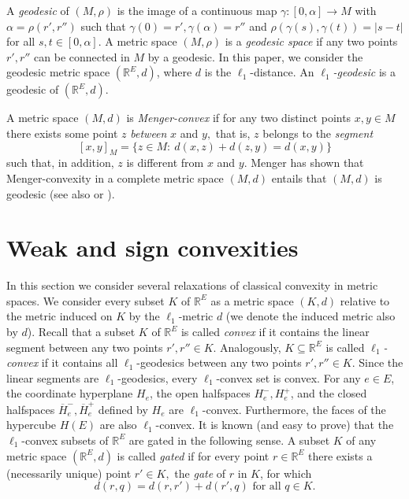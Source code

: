 \documentclass[11pt,a4paper]{amsart}
\theoremstyle{definition}
\numberwithin{equation}{section}
\newcommand{\HH}{\ensuremath{H}}
\newcommand{\MM}{\ensuremath{M}}
\begin{document}
A \emph{geodesic} of $(M,\rho)$ is the image of a continuous map $\gamma: [0,\alpha]\rightarrow M$ with $\alpha=\rho(r',r'')$ such that $\gamma(0)=r', \gamma(\alpha)=r''$ and $\rho(\gamma(s),\gamma(t))=|s-t|$ for all $s,t\in [0,\alpha]$. A metric space $(M,\rho)$ is a \emph{geodesic space} \cite{BrHa} if any two points $r',r''$ can be connected in $M$ by a geodesic. In this paper, we consider the geodesic metric space $({\mathbb R}^E, d)$, where $d$ is the $\ell_1$-distance. An \emph{$\ell_1$-geodesic} is a geodesic of  $({\mathbb R}^E, d)$.

A metric space $(\MM,d)$ is {\it Menger-convex} if for any two distinct points $x,y\in \MM$ there exists some point $z$ {\it between} $x$ and $y,$ that is, $z$ belongs to the {\it segment} $$[x,y]_{\MM}=\{z\in \MM: ~d(x,z) + d(z,y) = d(x,y)\}$$
such that, in addition, $z$ is different from $x$  and $y$. Menger \cite{Me} has shown that Menger-convexity in a complete metric space $(\MM,d)$
entails that $(\MM,d)$ is geodesic (see also \cite{Aro} or \cite[\S 18.5]{Ri}).


\section{Weak and sign convexities} \label{weak-sign-convexity} In this section we consider several relaxations of classical convexity in metric  spaces.
We consider every subset $K$ of ${\mathbb R}^E$ as a metric space $(K,d)$ relative to the metric induced on $K$ by the $\ell_1$-metric $d$ (we denote the induced metric also by $d$). Recall that a subset $K$ of  ${\mathbb R}^E$  is called \emph{convex} if it contains the linear segment between any two points $r',r''\in K$. Analogously,
 $K\subseteq {\mathbb R}^E$ is called \emph{$\ell_1$-convex} if it contains all $\ell_1$-geodesics between any two points $r',r''\in K$. Since the linear segments are  $\ell_1$-geodesics, every $\ell_1$-convex set is convex.
 For any $e\in E$, the coordinate hyperplane $H_e$, the open halfspaces $H^-_e,H^+_e$, and the closed halfspaces $\overline{H}^-_e,\overline{H}^+_e$ defined by $H_e$ are $\ell_1$-convex. Furthermore, the faces of the hypercube $\HH(E)$ are also $\ell_1$-convex. It is known (and easy to prove) that the $\ell_1$-convex subsets of ${\mathbb R}^E$ are gated in the following sense. A subset $K$ of any metric space $({\mathbb R}^E,d)$ is called {\it gated} \cite{DrScha}  if for
every point $r\in {\mathbb R}^E$ there exists a (necessarily unique) point $r'\in K,$ the {\it gate} of $r$ in $K$, for which $$d(r,q)=d(r,r')+d(r',q) \mbox{ for all } q\in K.$$
\end{document}

